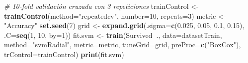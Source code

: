 \documentclass[]{article}
\newenvironment{Shaded}{\begin{snugshade}}{\end{snugshade}}
\newcommand{\KeywordTok}[1]{\textcolor[rgb]{0.13,0.29,0.53}{\textbf{#1}}}
\newcommand{\DataTypeTok}[1]{\textcolor[rgb]{0.13,0.29,0.53}{#1}}
\newcommand{\DecValTok}[1]{\textcolor[rgb]{0.00,0.00,0.81}{#1}}
\newcommand{\FloatTok}[1]{\textcolor[rgb]{0.00,0.00,0.81}{#1}}
\newcommand{\StringTok}[1]{\textcolor[rgb]{0.31,0.60,0.02}{#1}}
\newcommand{\CommentTok}[1]{\textcolor[rgb]{0.56,0.35,0.01}{\textit{#1}}}
\newcommand{\OperatorTok}[1]{\textcolor[rgb]{0.81,0.36,0.00}{\textbf{#1}}}
\newcommand{\NormalTok}[1]{#1}
\begin{document}
\begin{Shaded}
\begin{Highlighting}[]
\CommentTok{# 10-fold validación cruzada con 3 repeticiones}
\NormalTok{trainControl <-}\StringTok{ }\KeywordTok{trainControl}\NormalTok{(}\DataTypeTok{method=}\StringTok{"repeatedcv"}\NormalTok{, }\DataTypeTok{number=}\DecValTok{10}\NormalTok{, }\DataTypeTok{repeats=}\DecValTok{3}\NormalTok{)}
\NormalTok{metric <-}\StringTok{ "Accuracy"}
\KeywordTok{set.seed}\NormalTok{(}\DecValTok{7}\NormalTok{)}
\NormalTok{grid <-}\StringTok{ }\KeywordTok{expand.grid}\NormalTok{(}\DataTypeTok{.sigma=}\KeywordTok{c}\NormalTok{(}\FloatTok{0.025}\NormalTok{, }\FloatTok{0.05}\NormalTok{, }\FloatTok{0.1}\NormalTok{, }\FloatTok{0.15}\NormalTok{), }\DataTypeTok{.C=}\KeywordTok{seq}\NormalTok{(}\DecValTok{1}\NormalTok{, }\DecValTok{10}\NormalTok{, }\DataTypeTok{by=}\DecValTok{1}\NormalTok{))}
\NormalTok{fit.svm <-}\StringTok{ }\KeywordTok{train}\NormalTok{(Survived}\OperatorTok{~}\NormalTok{., }\DataTypeTok{data=}\NormalTok{datasetTrain, }\DataTypeTok{method=}\StringTok{"svmRadial"}\NormalTok{, }\DataTypeTok{metric=}\NormalTok{metric, }\DataTypeTok{tuneGrid=}\NormalTok{grid,}
    \DataTypeTok{preProc=}\KeywordTok{c}\NormalTok{(}\StringTok{"BoxCox"}\NormalTok{), }\DataTypeTok{trControl=}\NormalTok{trainControl)}
\KeywordTok{print}\NormalTok{(fit.svm)}
\end{Highlighting}
\end{Shaded}
\end{document}
